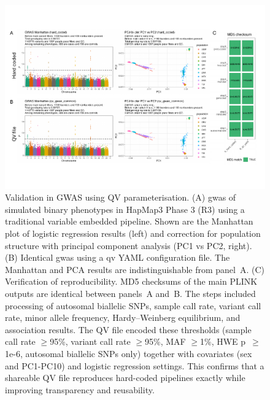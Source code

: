 \begin{figure}[h]
\centering
\includegraphics[width=\textwidth]{./images/hapmap_gwas_validation.pdf}
\caption{Validation in GWAS using QV parameterisation. 
(A) \ac{gwas} of simulated binary phenotypes in HapMap3 Phase 3 (R3) using a traditional variable embedded pipeline. Shown are the Manhattan plot of logistic regression results (left) and correction for population structure with principal component analysis (PC1 vs PC2, right). 
(B) Identical \ac{gwas} using a \ac{qv} YAML configuration file. The Manhattan and PCA results are indistinguishable from panel~A. 
(C) Verification of reproducibility. MD5 checksums of the main PLINK outputs are identical between panels~A and~B. The steps included processing of autosomal biallelic SNPs, sample call rate, variant call rate, minor allele frequency, Hardy–Weinberg equilibrium, and association results. The QV file encoded these thresholds (sample call rate $\geq$95\%, variant call rate $\geq$95\%, MAF $\geq$1\%, HWE p~$\geq$1e-6, autosomal biallelic SNPs only) together with covariates (sex and PC1-PC10) and logistic regression settings. This confirms that a shareable QV file reproduces hard-coded pipelines exactly while improving transparency and reusability.
}
    \label{fig:hapmap_gwas_validation}
\end{figure}

